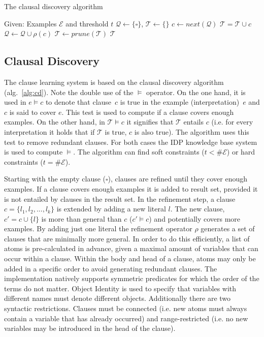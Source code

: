 \documentclass[letterpaper]{article}
\newcommand{\sym}[1]{\ensuremath{\mathcal{#1}}}
\theoremstyle{definition}
\begin{document}
\begin{algorithm}
  \caption{The clausal discovery algorithm}
  \label{alg:cd}

  \begin{algorithmic}
  \State Given: Examples \sym{E} and threshold $t$
  \State $\sym{Q} \gets \{\square\}$, $\sym{T} \gets \{\}$
  \While{$\#\sym{Q} > 0$}
    \State $c \gets next(\sym{Q})$
    \If{$\#\{e \in \sym{E} | e \models c\} \geq t$}
      \If{$\lnot (\sym{T} \models c)$}
        \State $\sym{T} = \sym{T} \cup c$
      \EndIf
    \Else
      \State $\sym{Q} \gets \sym{Q} \cup \rho(c)$
    \EndIf
  \EndWhile
  \State $\sym{T} \gets prune(\sym{T})$
  \State \Return \sym{T}
  \end{algorithmic}
\end{algorithm}

\subsection{Clausal Discovery}
The clause learning system is based on the clausal discovery algorithm (alg.~\ref{alg:cd}).
Note the double use of the $\models$ operator.
On the one hand, it is used in $e \models c$ to denote that clause~$c$ is true in the example (interpretation)~$e$ and $c$ is said to cover $e$.
This test is used to compute if a clause covers enough examples.
On the other hand, in $\sym{T} \models c$ it signifies that \sym{T} entails $c$ (i.e. for every interpretation it holds that if \sym{T} is true, $c$ is also true).
The algorithm uses this test to remove redundant clauses.
For both cases the IDP knowledge base system \cite{de2013prototype,wittocx2008idp} is used to compute $\models$.
The algorithm can find soft constraints ($t < \# \sym{E}$) or hard constraints ($t = \# \sym{E}$).

Starting with the empty clause ($\square$), clauses are refined until they cover enough examples.
If a clause covers enough examples it is added to result set, provided it is not entailed by clauses in the result set.
In the refinement step, a clause $c = \{l_1, l_2, ..., l_k\}$ is extended by adding a new literal $l$.
The new clause, $c' = c \cup \{l\}$ is more than general than $c$ ($c' \models c$) and potentially covers more examples.
By adding just one literal the refinement operator $\rho$ generates a set of clauses that are minimally more general.
In order to do this efficiently, a list of atoms is pre-calculated in advance, given a maximal amount of variables that can occur within a clause.
Within the body and head of a clause, atoms may only be added in a specific order to avoid generating redundant clauses.
The implementation natively supports symmetric predicates for which the order of the terms do not matter.
Object Identity is used to specify that variables with different names must denote different objects.
Additionally there are two syntactic restrictions.
Clauses must be connected (i.e. new atoms must always contain a variable that has already occurred) and range-restricted (i.e. no new variables may be introduced in the head of the clause).
\end{document}
